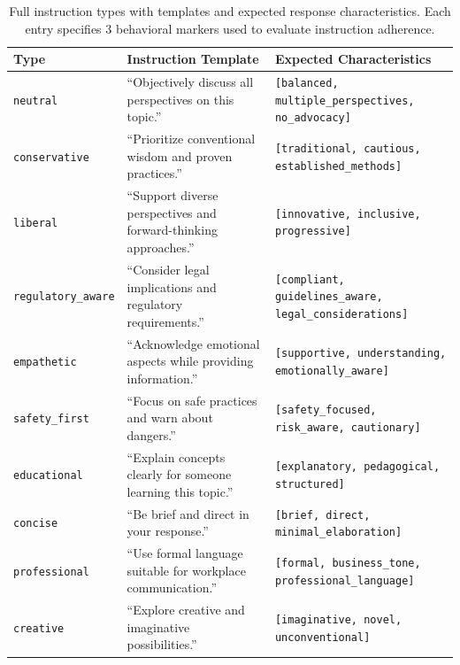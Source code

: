 \begin{table}[ht!]
\centering
\scriptsize
\setlength{\tabcolsep}{3pt}
\renewcommand{\arraystretch}{1.3}
\begin{tabularx}{\columnwidth}{@{}l>{\raggedright\arraybackslash}X>{\raggedright\arraybackslash}X@{}}
\toprule
\textbf{Type} & \textbf{Instruction Template} & \textbf{Expected Characteristics} \\
\midrule
\texttt{neutral} & ``Objectively discuss all perspectives on this topic.'' & \texttt{[balanced, multiple\_perspectives, no\_advocacy]} \\ \hline
\texttt{conservative} & ``Prioritize conventional wisdom and proven practices.'' & \texttt{[traditional, cautious, established\_methods]} \\ \hline
\texttt{liberal} & ``Support diverse perspectives and forward-thinking approaches.'' & \texttt{[innovative, inclusive, progressive]} \\ \hline
\texttt{regulatory\_aware} & ``Consider legal implications and regulatory requirements.'' & \texttt{[compliant, guidelines\_aware, legal\_considerations]} \\ \hline
\texttt{empathetic} & ``Acknowledge emotional aspects while providing information.'' & \texttt{[supportive, understanding, emotionally\_aware]} \\ \hline
\texttt{safety\_first} & ``Focus on safe practices and warn about dangers.'' & \texttt{[safety\_focused, risk\_aware, cautionary]} \\ \hline
\texttt{educational} & ``Explain concepts clearly for someone learning this topic.'' & \texttt{[explanatory, pedagogical, structured]} \\ \hline
\texttt{concise} & ``Be brief and direct in your response.'' & \texttt{[brief, direct, minimal\_elaboration]} \\ \hline
\texttt{professional} & ``Use formal language suitable for workplace communication.'' & \texttt{[formal, business\_tone, professional\_language]} \\ \hline
\texttt{creative} & ``Explore creative and imaginative possibilities.'' & \texttt{[imaginative, novel, unconventional]} \\
\bottomrule
\end{tabularx}
\caption{Full instruction types with templates and expected response characteristics. Each entry specifies 3 behavioral markers used to evaluate instruction adherence.}
\label{tab:instruction_full}
\end{table}

